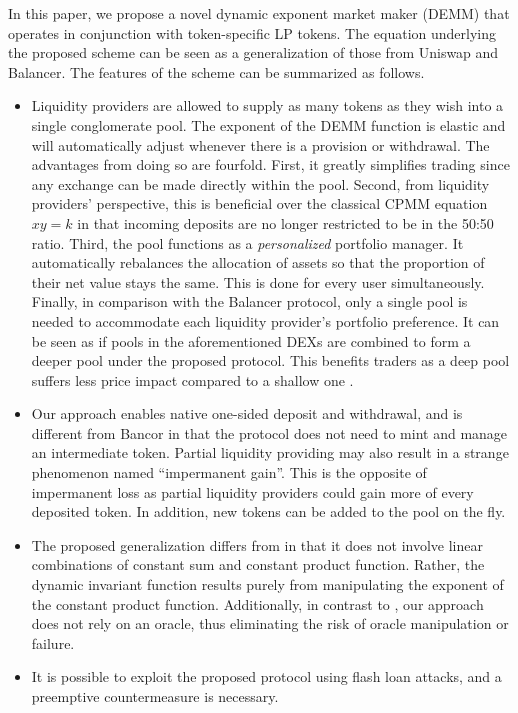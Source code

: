 \documentclass[12pt,a4paper]{article}
\begin{document}
In this paper, we propose a novel dynamic exponent market maker (DEMM) that operates in conjunction with token-specific LP tokens. The equation underlying the proposed scheme can be seen as a generalization of those from Uniswap and Balancer. The features of the scheme can be summarized as follows.
\begin{itemize}
\item Liquidity providers are allowed to supply as many tokens as they wish into a single conglomerate pool. The exponent of the DEMM function is elastic and will automatically adjust whenever there is a provision or withdrawal. The advantages from doing so are fourfold. First, it greatly simplifies trading since any exchange can be made directly within the pool. Second, from liquidity providers' perspective, this is beneficial over the classical CPMM equation $xy=k$ in that incoming deposits are no longer restricted to be in the 50:50 ratio. Third, the pool functions as a \emph{personalized} portfolio manager. It automatically rebalances the allocation of assets so that the proportion of their net value stays the same. This is done for every user simultaneously. Finally, in comparison with the Balancer protocol, only a single pool is needed to accommodate each liquidity provider's portfolio preference. It can be seen as if pools in the aforementioned DEXs are combined to form a deeper pool under the proposed protocol. This benefits traders as a deep pool suffers less price impact compared to a shallow one \cite{W}.
\item Our approach enables native one-sided deposit and withdrawal, and is different from Bancor \cite{B1,B2} in that the protocol does not need to mint and manage an intermediate token. Partial liquidity providing may also result in a strange phenomenon named ``impermanent gain''. This is the opposite of impermanent loss as partial liquidity providers could gain more of every deposited token. In addition, new tokens can be added to the pool on the fly.
\item The proposed generalization differs from \cite{FK} in that it does not involve linear combinations of constant sum and constant product function. Rather, the dynamic invariant function results purely from manipulating the exponent of the constant product function. Additionally, in contrast to \cite{KFG}, our approach does not rely on an oracle, thus eliminating the risk of oracle manipulation or failure. 
\item It is possible to exploit the proposed protocol using flash loan attacks, and a preemptive countermeasure is necessary.
\end{itemize}
\end{document}
